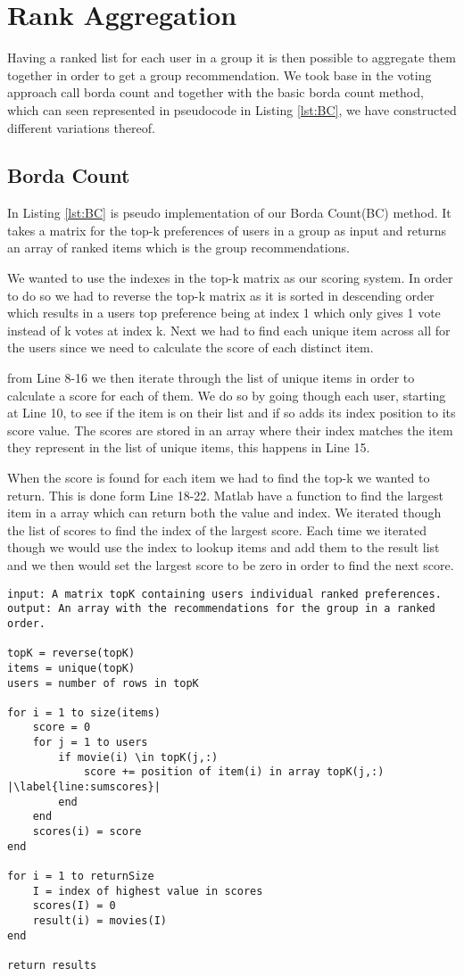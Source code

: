 \section{Rank Aggregation}\label{sec:rank_aggregation}
Having a ranked list for each user in a group it is then possible to aggregate them together in order to get a group recommendation. We took base in the voting approach call borda count and together with the basic borda count method, which can seen represented in pseudocode in Listing \ref{lst:BC}, we have constructed different variations thereof. 
\subsection{Borda Count}
In Listing \ref{lst:BC} is pseudo implementation of our Borda Count(BC) method. It takes a matrix for the top-k preferences of users in a group as input and returns an array of ranked items which is the group recommendations. 

We wanted to use the indexes in the top-k matrix as our scoring system. In order to do so we had to reverse the top-k matrix as it is sorted in descending order which results in a users top preference being at index 1 which only gives 1 vote instead of k votes at index k. Next we had to find each unique item across all for the users since we need to calculate the score of each distinct item.

from Line 8-16 we then iterate through the list of unique items in order to calculate a score for each of them. We do so by going though each user, starting at Line 10, to see if the item is on their list and if so adds its index position to its score value. The scores are stored in an array where their index matches the item they represent in the list of unique items, this happens in Line 15.

When the score is found for each item we had to find the top-k we wanted to return. This is done form Line 18-22. Matlab have a function to find the largest item in a array which can return both the value and index. We iterated though the list of scores to find the index of the largest score. Each time we iterated though we would use the index to lookup items and add them to the result list and we then would set the largest score to be zero in order to find the next score. 
\begin{lstlisting}[caption={Borda count implementation},label=lst:BC,escapechar=|]
input: A matrix topK containing users individual ranked preferences.
output: An array with the recommendations for the group in a ranked order.

topK = reverse(topK)
items = unique(topK)
users = number of rows in topK

for i = 1 to size(items)
	score = 0
	for j = 1 to users
		if movie(i) \in topK(j,:)
			score += position of item(i) in array topK(j,:) |\label{line:sumscores}|
		end
	end
	scores(i) = score
end

for i = 1 to returnSize
	I = index of highest value in scores
	scores(I) = 0
	result(i) = movies(I)
end

return results

\end{lstlisting}

